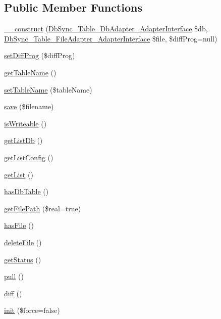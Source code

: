 \subsection*{Public Member Functions}
\begin{DoxyCompactItemize}
\item 
\hyperlink{classDbSync__Table__AbstractTable_a7be38fca9d01a74c007366439d7ed3cf}{\_\-\_\-construct} (\hyperlink{interfaceDbSync__Table__DbAdapter__AdapterInterface}{DbSync\_\-Table\_\-DbAdapter\_\-AdapterInterface} \$db, \hyperlink{interfaceDbSync__Table__FileAdapter__AdapterInterface}{DbSync\_\-Table\_\-FileAdapter\_\-AdapterInterface} \$file, \$diffProg=null)
\item 
\hyperlink{classDbSync__Table__AbstractTable_a602dcefdf77e6469d86640398fcc6f3e}{setDiffProg} (\$diffProg)
\item 
\hyperlink{classDbSync__Table__AbstractTable_a73bb91b00d38f9653f822ce5f22fdc85}{getTableName} ()
\item 
\hyperlink{classDbSync__Table__AbstractTable_ab404bd1cdfb4ff587049ddaa763bbdfc}{setTableName} (\$tableName)
\item 
\hyperlink{classDbSync__Table__AbstractTable_a6c761e01599281f6d057094e00e40c8a}{save} (\$filename)
\item 
\hyperlink{classDbSync__Table__AbstractTable_a57772ff792f746e80ed34375ab2c7953}{isWriteable} ()
\item 
\hyperlink{classDbSync__Table__AbstractTable_a7185ca51ac03d3c30225ec350dab000d}{getListDb} ()
\item 
\hyperlink{classDbSync__Table__AbstractTable_ab650d6290afb12319a792eafb844db80}{getListConfig} ()
\item 
\hyperlink{classDbSync__Table__AbstractTable_a883d73aa5b5f30db79172c7934e28ddc}{getList} ()
\item 
\hyperlink{classDbSync__Table__AbstractTable_a247c6ebe39888ce659265e90701ad66d}{hasDbTable} ()
\item 
\hyperlink{classDbSync__Table__AbstractTable_a69d854fa880beb9ce0a589e0e604c78d}{getFilePath} (\$real=true)
\item 
\hyperlink{classDbSync__Table__AbstractTable_a4129bcdf6e1caaae2f2a2f27471a66a6}{hasFile} ()
\item 
\hyperlink{classDbSync__Table__AbstractTable_a5633ace9bdfd4f6b0d1b6498492e8be8}{deleteFile} ()
\item 
\hyperlink{classDbSync__Table__AbstractTable_a3c98d38cfab450c5df4c7f74ab0054e5}{getStatus} ()
\item 
\hyperlink{classDbSync__Table__AbstractTable_a6d18b62e3ba05af99b5ae0f57f3d6f6b}{pull} ()
\item 
\hyperlink{classDbSync__Table__AbstractTable_a77fdfb2eb8a96c4d646bbf756d9ab9ce}{diff} ()
\item 
\hyperlink{classDbSync__Table__AbstractTable_abaa8cce0accbd902cc0ae32597e4966d}{init} (\$force=false)
\end{DoxyCompactItemize}
